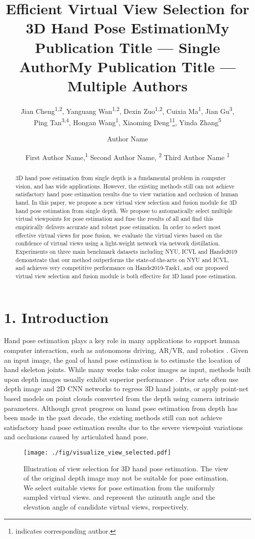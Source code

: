 \documentclass[letterpaper]{article} \usepackage{aaai22}  \usepackage{times}  \usepackage{helvet}  \usepackage{courier}  \usepackage[hyphens]{url}  \usepackage{graphicx} \urlstyle{rm} \def\UrlFont{\rm}  \usepackage{natbib}  \usepackage{caption} \DeclareCaptionStyle{ruled}{labelfont=normalfont,labelsep=colon,strut=off} \frenchspacing  \setlength{\pdfpagewidth}{8.5in}  \setlength{\pdfpageheight}{11in}  \usepackage{algorithm}
\title{Efficient Virtual View Selection for 3D Hand Pose Estimation}
\author{
    Jian Cheng\textsuperscript{\rm 1,2}\equalcontrib, 
    Yanguang Wan\textsuperscript{\rm 1,2}\equalcontrib,
    Dexin Zuo\textsuperscript{\rm 1,2},
    Cuixia Ma\textsuperscript{\rm 1},
    Jian Gu\textsuperscript{\rm 3},\\
    Ping Tan\textsuperscript{\rm 3,4},
    Hongan Wang\textsuperscript{\rm 1},
    Xiaoming Deng\textsuperscript{\rm 1}\thanks{indicates corresponding author.},
    Yinda Zhang\textsuperscript{\rm 5\dag}
}
\title{My Publication Title --- Single Author}
\author {
    Author Name
}
\title{My Publication Title --- Multiple Authors}
\author {
First Author Name,\textsuperscript{\rm 1}
    Second Author Name, \textsuperscript{\rm 2}
    Third Author Name \textsuperscript{\rm 1}
}
\begin{document}
\maketitle

\begin{abstract}
3D hand pose estimation from single depth is a fundamental problem in computer vision, and has wide applications.
However, the existing methods still can not achieve satisfactory hand pose estimation results due to view variation and occlusion of human hand. In this paper, we propose a new virtual view selection and fusion module for 3D hand pose estimation from single depth.
We propose to automatically select multiple virtual viewpoints for pose estimation and fuse the results of all and find this empirically delivers accurate and robust pose estimation.
In order to select most effective virtual views for pose fusion, we evaluate the virtual views based on the confidence of virtual views using a light-weight network via network distillation.
Experiments on three main benchmark datasets including NYU, ICVL and Hands2019 demonstrate that our method outperforms the state-of-the-arts on NYU and ICVL, and achieves very competitive performance on Hands2019-Task1, and our proposed virtual view selection and fusion module is both effective for 3D hand pose estimation. 
\end{abstract}

\section{1. Introduction}
Hand pose estimation plays a key role in many applications to support human computer interaction, such as autonomous driving, AR/VR, and robotics \cite{Erolsurvey}.
Given an input image, the goal of hand pose estimation is to estimate the location of hand skeleton joints.
While many works take color images as input, methods built upon depth images usually exhibit superior performance \cite{sun2015cascaded}. 
Prior arts often use depth image and 2D CNN networks to regress 3D hand joints, or apply point-net based models \cite{qi2017pointnet,ge2018_Point} on point clouds converted from the depth using camera intrinsic parameters.
Although great progress on hand pose estimation from depth has been made in the past decade, the existing methods still can not achieve satisfactory hand pose estimation results due to the severe viewpoint variations and occlusions caused by articulated hand pose.

\begin{figure}[h]
\centering 
\texttt{[image: ./fig/visualize\_view\_selected.pdf]}
\caption{Illustration of view selection for 3D hand pose estimation. The view of the original depth image may not be suitable for pose estimation. We select suitable views for pose estimation from the uniformly sampled virtual views.  and  represent the azimuth angle and the elevation angle of candidate virtual views, respectively.}
\label{fig:view_selected}
\end{figure}
\end{document}

